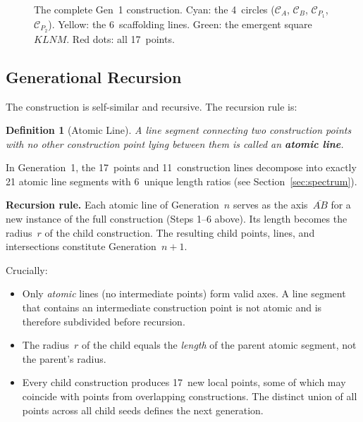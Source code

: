 \documentclass[12pt, a4paper]{article}
\newtheorem{definition}{Definition}
\begin{document}
\begin{figure}[ht]
\caption{The complete Gen~1 construction. Cyan: the 4~circles ($\mathcal{C}_A$, $\mathcal{C}_B$, $\mathcal{C}_{P_1}$, $\mathcal{C}_{P_2}$). Yellow: the 6~scaffolding lines. Green: the emergent square $KLNM$. Red dots: all 17~points.}
\label{fig:construction}
\end{figure}

\subsection{Generational Recursion}\label{sec:recursion}

The construction is self-similar and recursive. The recursion rule is:

\begin{definition}[Atomic Line]
A line segment connecting two construction points with no other construction point lying between them is called an \textbf{atomic line}.
\end{definition}

\noindent In Generation~1, the 17~points and 11~construction lines decompose into exactly 21 atomic line segments with 6~unique length ratios (see Section~\ref{sec:spectrum}).

\medskip

\noindent\textbf{Recursion rule.} Each atomic line of Generation~$n$ serves as the axis~$\overline{AB}$ for a new instance of the full construction (Steps 1--6 above). Its length becomes the radius~$r$ of the child construction. The resulting child points, lines, and intersections constitute Generation~$n{+}1$.

\medskip

\noindent Crucially:
\begin{itemize}[nosep]
    \item Only \emph{atomic} lines (no intermediate points) form valid axes. A line segment that contains an intermediate construction point is not atomic and is therefore subdivided before recursion.
    \item The radius~$r$ of the child equals the \emph{length} of the parent atomic segment, not the parent's radius.
    \item Every child construction produces 17~new local points, some of which may coincide with points from overlapping constructions. The distinct union of all points across all child seeds defines the next generation.
\end{itemize}
\end{document}
